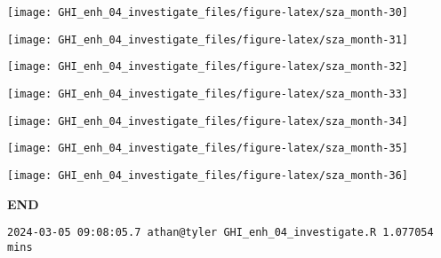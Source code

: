 \documentclass[
  10pt,
  a4paper,oneside]{article}
\begin{document}
\begin{center}\texttt{[image: GHI\_enh\_04\_investigate\_files/figure-latex/sza\_month-30]} \end{center}

\begin{center}\texttt{[image: GHI\_enh\_04\_investigate\_files/figure-latex/sza\_month-31]} \end{center}

\begin{center}\texttt{[image: GHI\_enh\_04\_investigate\_files/figure-latex/sza\_month-32]} \end{center}

\begin{center}\texttt{[image: GHI\_enh\_04\_investigate\_files/figure-latex/sza\_month-33]} \end{center}

\begin{center}\texttt{[image: GHI\_enh\_04\_investigate\_files/figure-latex/sza\_month-34]} \end{center}

\begin{center}\texttt{[image: GHI\_enh\_04\_investigate\_files/figure-latex/sza\_month-35]} \end{center}

\begin{center}\texttt{[image: GHI\_enh\_04\_investigate\_files/figure-latex/sza\_month-36]} \end{center}

\textbf{END}

\begin{verbatim}
2024-03-05 09:08:05.7 athan@tyler GHI_enh_04_investigate.R 1.077054 mins
\end{verbatim}
\end{document}
